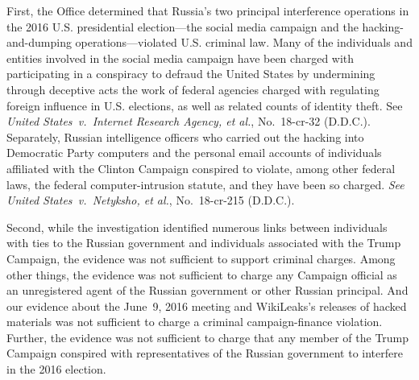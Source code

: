 First, the Office determined that Russia's two principal interference operations in the 2016 U.S. presidential election---the social media campaign and the hacking-and-dumping operations---violated U.S. criminal law.
Many of the individuals and entities involved in the social media campaign have been charged with participating in a conspiracy to defraud the United States by undermining through deceptive acts the work of federal agencies charged with regulating foreign influence in U.S. elections, as well as related counts of identity theft. See \textit{United States~v.\ Internet Research Agency, et al.}, No.~18-cr-32 (D.D.C.).
Separately, Russian intelligence officers who carried out the hacking into Democratic Party computers and the personal email accounts of individuals affiliated with the Clinton Campaign conspired to violate, among other federal laws, the federal computer-intrusion statute, and they have been so charged.
\textit{See United States~v.\ Netyksho, et al.}, No.~18-cr-215 (D.D.C.).


Second, while the investigation identified numerous links between individuals with ties to the Russian government and individuals associated with the Trump Campaign, the evidence was not sufficient to support criminal charges.
Among other things, the evidence was not sufficient to charge any Campaign official as an unregistered agent of the Russian government or other Russian principal.
And our evidence about the June~9, 2016 meeting and WikiLeaks's releases of hacked materials was not sufficient to charge a criminal campaign-finance violation.
Further, the evidence was not sufficient to charge that any member of the Trump Campaign conspired with representatives of the Russian government to interfere in the 2016 election.

